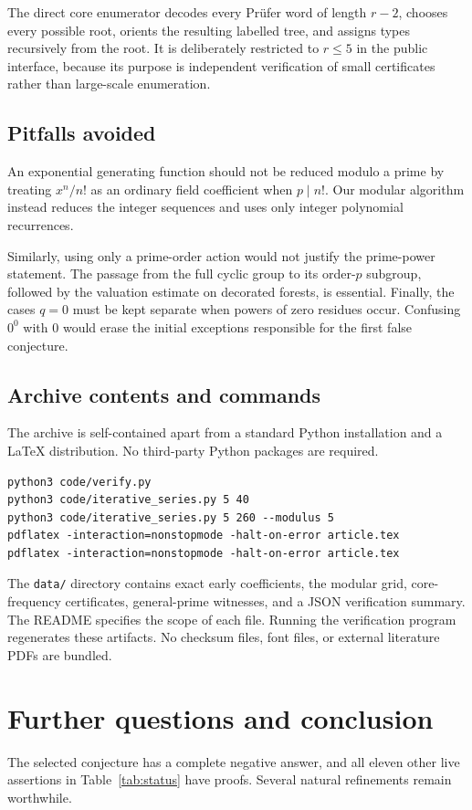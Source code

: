 \documentclass[11pt,letterpaper]{article}
\theoremstyle{definition}
\theoremstyle{remark}
\begin{document}
The direct core enumerator decodes every Pr\"ufer word of length $r-2$,
chooses every possible root, orients the resulting labelled tree, and
assigns types recursively from the root. It is deliberately restricted
to $r\le5$ in the public interface, because its purpose is independent
verification of small certificates rather than large-scale enumeration.

\subsection{Pitfalls avoided}
An exponential generating function should not be reduced modulo a prime
by treating $x^n/n!$ as an ordinary field coefficient when $p\mid n!$.
Our modular algorithm instead reduces the integer sequences and uses
only integer polynomial recurrences.

Similarly, using only a prime-order action would not justify the
prime-power statement. The passage from the full cyclic group to its
order-$p$ subgroup, followed by the valuation estimate on decorated
forests, is essential. Finally, the cases $q=0$ must be kept separate
when powers of zero residues occur. Confusing $0^0$ with $0$ would erase
the initial exceptions responsible for the first false conjecture.

\subsection{Archive contents and commands}
The archive is self-contained apart from a standard Python installation
and a LaTeX distribution. No third-party Python packages are required.
\begin{lstlisting}
python3 code/verify.py
python3 code/iterative_series.py 5 40
python3 code/iterative_series.py 5 260 --modulus 5
pdflatex -interaction=nonstopmode -halt-on-error article.tex
pdflatex -interaction=nonstopmode -halt-on-error article.tex
\end{lstlisting}

The \texttt{data/} directory contains exact early coefficients, the
modular grid, core-frequency certificates, general-prime witnesses, and
a JSON verification summary. The README specifies the scope of each
file. Running the verification program regenerates these artifacts.
No checksum files, font files, or external literature PDFs are bundled.

\section{Further questions and conclusion}\label{sec:conclusion}
The selected conjecture has a complete negative answer, and all eleven
other live assertions in Table~\ref{tab:status} have proofs. Several
natural refinements remain worthwhile.
\end{document}
